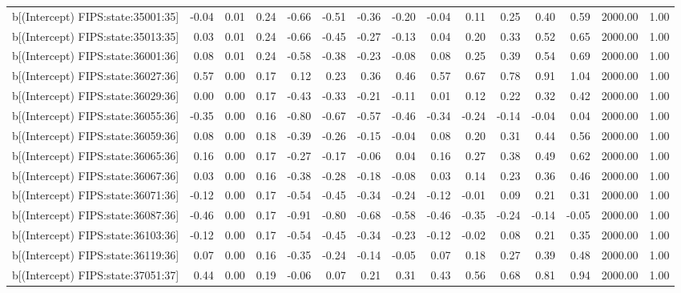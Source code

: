 \begin{table}[ht]
\begin{tabular}{rrrrrrrrrrrrrrr}
  b[(Intercept) FIPS:state:35001:35] & -0.04 & 0.01 & 0.24 & -0.66 & -0.51 & -0.36 & -0.20 & -0.04 & 0.11 & 0.25 & 0.40 & 0.59 & 2000.00 & 1.00 \\ 
  b[(Intercept) FIPS:state:35013:35] & 0.03 & 0.01 & 0.24 & -0.66 & -0.45 & -0.27 & -0.13 & 0.04 & 0.20 & 0.33 & 0.52 & 0.65 & 2000.00 & 1.00 \\ 
  b[(Intercept) FIPS:state:36001:36] & 0.08 & 0.01 & 0.24 & -0.58 & -0.38 & -0.23 & -0.08 & 0.08 & 0.25 & 0.39 & 0.54 & 0.69 & 2000.00 & 1.00 \\ 
  b[(Intercept) FIPS:state:36027:36] & 0.57 & 0.00 & 0.17 & 0.12 & 0.23 & 0.36 & 0.46 & 0.57 & 0.67 & 0.78 & 0.91 & 1.04 & 2000.00 & 1.00 \\ 
  b[(Intercept) FIPS:state:36029:36] & 0.00 & 0.00 & 0.17 & -0.43 & -0.33 & -0.21 & -0.11 & 0.01 & 0.12 & 0.22 & 0.32 & 0.42 & 2000.00 & 1.00 \\ 
  b[(Intercept) FIPS:state:36055:36] & -0.35 & 0.00 & 0.16 & -0.80 & -0.67 & -0.57 & -0.46 & -0.34 & -0.24 & -0.14 & -0.04 & 0.04 & 2000.00 & 1.00 \\ 
  b[(Intercept) FIPS:state:36059:36] & 0.08 & 0.00 & 0.18 & -0.39 & -0.26 & -0.15 & -0.04 & 0.08 & 0.20 & 0.31 & 0.44 & 0.56 & 2000.00 & 1.00 \\ 
  b[(Intercept) FIPS:state:36065:36] & 0.16 & 0.00 & 0.17 & -0.27 & -0.17 & -0.06 & 0.04 & 0.16 & 0.27 & 0.38 & 0.49 & 0.62 & 2000.00 & 1.00 \\ 
  b[(Intercept) FIPS:state:36067:36] & 0.03 & 0.00 & 0.16 & -0.38 & -0.28 & -0.18 & -0.08 & 0.03 & 0.14 & 0.23 & 0.36 & 0.46 & 2000.00 & 1.00 \\ 
  b[(Intercept) FIPS:state:36071:36] & -0.12 & 0.00 & 0.17 & -0.54 & -0.45 & -0.34 & -0.24 & -0.12 & -0.01 & 0.09 & 0.21 & 0.31 & 2000.00 & 1.00 \\ 
  b[(Intercept) FIPS:state:36087:36] & -0.46 & 0.00 & 0.17 & -0.91 & -0.80 & -0.68 & -0.58 & -0.46 & -0.35 & -0.24 & -0.14 & -0.05 & 2000.00 & 1.00 \\ 
  b[(Intercept) FIPS:state:36103:36] & -0.12 & 0.00 & 0.17 & -0.54 & -0.45 & -0.34 & -0.23 & -0.12 & -0.02 & 0.08 & 0.21 & 0.35 & 2000.00 & 1.00 \\ 
  b[(Intercept) FIPS:state:36119:36] & 0.07 & 0.00 & 0.16 & -0.35 & -0.24 & -0.14 & -0.05 & 0.07 & 0.18 & 0.27 & 0.39 & 0.48 & 2000.00 & 1.00 \\ 
  b[(Intercept) FIPS:state:37051:37] & 0.44 & 0.00 & 0.19 & -0.06 & 0.07 & 0.21 & 0.31 & 0.43 & 0.56 & 0.68 & 0.81 & 0.94 & 2000.00 & 1.00 \\ 

\end{tabular}
\end{table}
